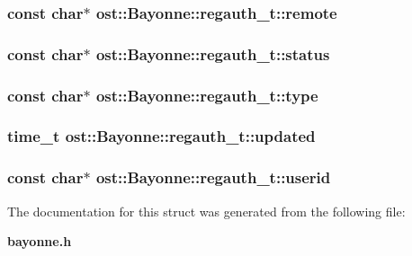 \subsubsection[{remote}]{\setlength{\rightskip}{0pt plus 5cm}const char$\ast$ {\bf ost::Bayonne::regauth\_\-t::remote}}\label{structost_1_1_bayonne_1_1regauth__t_a64e207a306594b24e592e2cfbcf4b546}
\subsubsection[{status}]{\setlength{\rightskip}{0pt plus 5cm}const char$\ast$ {\bf ost::Bayonne::regauth\_\-t::status}}\label{structost_1_1_bayonne_1_1regauth__t_aeca3ba8c1f95cdb1859128290db0a30b}
\subsubsection[{type}]{\setlength{\rightskip}{0pt plus 5cm}const char$\ast$ {\bf ost::Bayonne::regauth\_\-t::type}}\label{structost_1_1_bayonne_1_1regauth__t_af8681d3e59d95d646df2d76f99c8b493}
\subsubsection[{updated}]{\setlength{\rightskip}{0pt plus 5cm}time\_\-t {\bf ost::Bayonne::regauth\_\-t::updated}}\label{structost_1_1_bayonne_1_1regauth__t_af8d3cccbe4cba6209cfd5533742d3a59}
\subsubsection[{userid}]{\setlength{\rightskip}{0pt plus 5cm}const char$\ast$ {\bf ost::Bayonne::regauth\_\-t::userid}}\label{structost_1_1_bayonne_1_1regauth__t_a7380640a750d9553f23835d0eb2150db}


The documentation for this struct was generated from the following file:\begin{DoxyCompactItemize}
\item 
{\bf bayonne.h}\end{DoxyCompactItemize}
